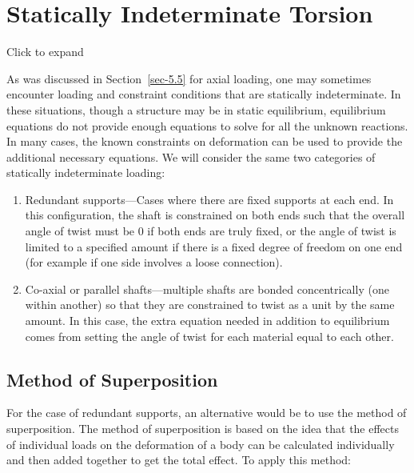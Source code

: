 \documentclass[
  letterpaper,
  DIV=11,
  numbers=noendperiod]{scrreprt}
\theoremstyle{definition}
\theoremstyle{remark}
\begin{document}
\section{Statically Indeterminate Torsion}\label{sec-6.3}

Click to expand

As was discussed in Section~\ref{sec-5.5} for axial loading, one may
sometimes encounter loading and constraint conditions that are
statically indeterminate. In these situations, though a structure may be
in static equilibrium, equilibrium equations do not provide enough
equations to solve for all the unknown reactions. In many cases, the
known constraints on deformation can be used to provide the additional
necessary equations. We will consider the same two categories of
statically indeterminate loading:

\begin{enumerate}
\def\labelenumi{\arabic{enumi}.}
\item
  Redundant supports---Cases where there are fixed supports at each end.
  In this configuration, the shaft is constrained on both ends such that
  the overall angle of twist must be 0 if both ends are truly fixed, or
  the angle of twist is limited to a specified amount if there is a
  fixed degree of freedom on one end (for example if one side involves a
  loose connection).
\item
  Co-axial or parallel shafts---multiple shafts are bonded
  concentrically (one within another) so that they are constrained to
  twist as a unit by the same amount. In this case, the extra equation
  needed in addition to equilibrium comes from setting the angle of
  twist for each material equal to each other.
\end{enumerate}

\subsection{Method of Superposition}\label{method-of-superposition}

For the case of redundant supports, an alternative would be to use the
method of superposition. The method of superposition is based on the
idea that the effects of individual loads on the deformation of a body
can be calculated individually and then added together to get the total
effect. To apply this method:
\end{document}
